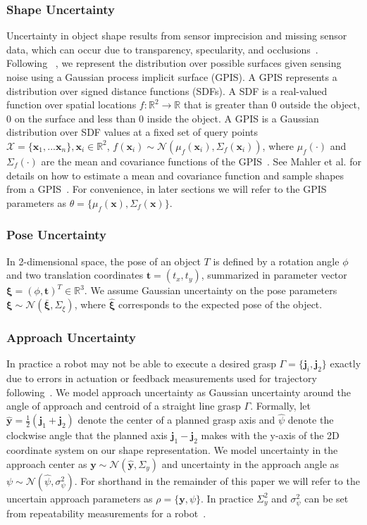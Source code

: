 \documentclass[10pt, conference]{ieeeconf}      %
\newcommand{\bj}{\mathbf{j}}
\newcommand{\bt}{\mathbf{t}}
\newcommand{\by}{\mathbf{y}}
\newcommand{\bx}{\mathbf{x}}
\newcommand{\mX}{\mathcal{X}}
\newcommand{\mN}{\mathcal{N}}
\begin{document}
\subsubsection{Shape Uncertainty}

Uncertainty in object shape results from sensor imprecision and missing sensor data, which can occur due to transparency, specularity, and occlusions~\cite{mahler2015gp}.
Following ~\cite{mahler2015gp}, we represent the distribution over possible surfaces given sensing noise using a Gaussian process implicit surface (GPIS).
A GPIS represents a distribution over signed distance functions (SDFs).
A SDF is a real-valued function over spatial locations $f: \mathbb{R}^2 \rightarrow \mathbb{R}$ that is greater than 0 outside the object, 0 on the surface and less than 0 inside the object.
A GPIS is a Gaussian distribution over SDF values at a fixed set of query points $\mX = \{\bx_1, ... \bx_n\}, \bx_i \in \mathbb{R}^2$, $f(\bx_i) \sim \mN(\mu_{f}(\bx_i),\Sigma_{f}(\bx_i))$, where $\mu_{f}(\cdot)$ and $\Sigma_{f}(\cdot)$ are the mean and covariance functions of the GPIS~\cite{rasmussen2006}.
See Mahler et al. for details on how to estimate a mean and covariance function and sample shapes from a GPIS~\cite{mahler2015gp}.
For convenience, in later sections we will refer to the GPIS parameters as $\theta = \lbrace \mu_{f}(\bx), \Sigma_{f}(\bx) \rbrace$. 


\subsubsection{Pose Uncertainty}
In 2-dimensional space, the pose of an object $T$ is defined by a rotation angle $\phi$ and two translation coordinates $\bt = (t_x, t_y)$, summarized in parameter vector $\mathbf{\xi} = (\phi, \bt)^T \in \mathbb{R}^3$.  We assume Gaussian uncertainty on the pose parameters $\mathbf{\xi} \sim \mN \left( \bar{\mathbf{\xi}}, \Sigma_{\xi} \right)$, where $\hat{\mathbf{\xi}}$ corresponds to the expected pose of the object. 

 
 \subsubsection{Approach Uncertainty}
In practice a robot may not be able to execute a desired grasp $\Gamma = \lbrace \bj_i,\bj_2\rbrace$ exactly due to errors in actuation or feedback measurements used for trajectory following~\cite{kehoe2012estimating}.
We model approach uncertainty as Gaussian uncertainty around the angle of approach and centroid of a straight line grasp $\Gamma$.
Formally, let $\hat{\by} = \frac{1}{2} (\bj_1 + \bj_2)$ denote the center of a planned grasp axis and $\hat{\psi}$ denote the clockwise angle that the planned axis $\bj_1 - \bj_2$ makes with the y-axis of the 2D coordinate system on our shape representation.
We model uncertainty in the approach center as $\by \sim \mN(\hat{\by}, \Sigma_y)$ and uncertainty in the approach angle as $\psi \sim \mN(\hat{\psi}, \sigma_{\psi}^2)$.
For shorthand in the remainder of this paper we will refer to the uncertain approach parameters as $\rho = \{\by, \psi \}$.
In practice $\Sigma_{y}^2$ and $\sigma_{\psi}^2$ can be set from repeatability measurements for a robot~\cite{mooring1986determination}.
\end{document}
